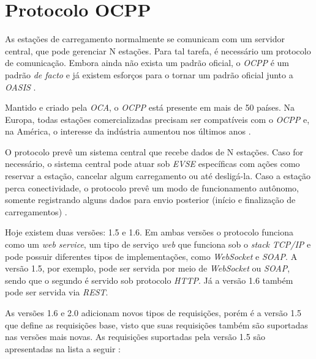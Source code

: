   \section{Protocolo OCPP}
  \label{stateofart:ocpp}

    As estações de carregamento normalmente se comunicam com um servidor central, que pode gerenciar N estações. Para tal tarefa, é necessário um protocolo de comunicação. Embora ainda não exista um padrão oficial, o \textit{\ac{OCPP}} é um padrão \textit{de facto} e já existem esforços para o tornar um padrão oficial junto a \textit{\ac{OASIS}} \cite{ocpp-news-standardization}.

    Mantido e criado pela \textit{\ac{OCA}}, o \textit{\ac{OCPP}} está presente em mais de 50 países. Na Europa, todas estações comercializadas precisam ser compatíveis com o \textit{\ac{OCPP}} e, na América, o interesse da indústria aumentou nos últimos anos \cite{forbes-news-ocpp}.

    O protocolo prevê um sistema central que recebe dados de N estações. Caso for necessário, o sistema central pode atuar sob \textit{\ac{EVSE}} específicas com ações como reservar a estação, cancelar algum carregamento ou até desligá-la. Caso a estação perca conectividade, o protocolo prevê um modo de funcionamento autônomo, somente registrando alguns dados para envio posterior (início e finalização de carregamentos) \cite{ocpp-spec-15}.

    Hoje existem duas versões: 1.5 e 1.6. Em ambas versões o protocolo funciona como um \textit{web service}, um tipo de serviço \textit{web} que funciona sob o \textit{stack} \textit{TCP/IP} e pode possuir diferentes tipos de implementações, como \textit{WebSocket} e \textit{\ac{SOAP}}. A versão 1.5, por exemplo, pode ser servida por meio de \textit{WebSocket} ou \textit{\ac{SOAP}}, sendo que o segundo é servido sob protocolo \textit{\ac{HTTP}}. Já a versão 1.6 também pode ser servida via \textit{\ac{REST}}.

    As versões 1.6 e 2.0 adicionam novos tipos de requisições, porém é a versão 1.5 que define as requisições base, visto que suas requisições também são suportadas nas versões mais novas. As requisições suportadas pela versão 1.5 são apresentadas na lista a seguir \cite{ocpp-spec-15}:

